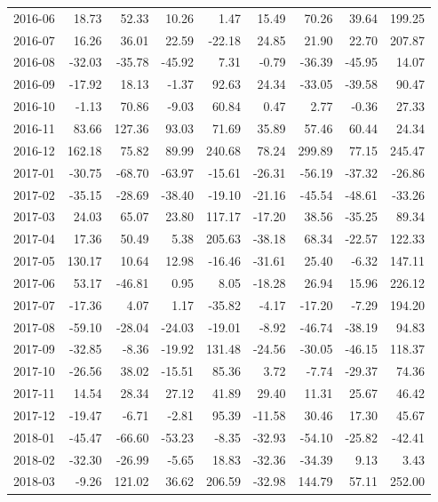 \begin{table}[ht]
\begin{tabular}{lrrrrrrrr}
  2016-06 & 18.73 & 52.33 & 10.26 & 1.47 & 15.49 & 70.26 & 39.64 & 199.25 \\ 
  2016-07 & 16.26 & 36.01 & 22.59 & -22.18 & 24.85 & 21.90 & 22.70 & 207.87 \\ 
  2016-08 & -32.03 & -35.78 & -45.92 & 7.31 & -0.79 & -36.39 & -45.95 & 14.07 \\ 
  2016-09 & -17.92 & 18.13 & -1.37 & 92.63 & 24.34 & -33.05 & -39.58 & 90.47 \\ 
  2016-10 & -1.13 & 70.86 & -9.03 & 60.84 & 0.47 & 2.77 & -0.36 & 27.33 \\ 
  2016-11 & 83.66 & 127.36 & 93.03 & 71.69 & 35.89 & 57.46 & 60.44 & 24.34 \\ 
  2016-12 & 162.18 & 75.82 & 89.99 & 240.68 & 78.24 & 299.89 & 77.15 & 245.47 \\ 
  2017-01 & -30.75 & -68.70 & -63.97 & -15.61 & -26.31 & -56.19 & -37.32 & -26.86 \\ 
  2017-02 & -35.15 & -28.69 & -38.40 & -19.10 & -21.16 & -45.54 & -48.61 & -33.26 \\ 
  2017-03 & 24.03 & 65.07 & 23.80 & 117.17 & -17.20 & 38.56 & -35.25 & 89.34 \\ 
  2017-04 & 17.36 & 50.49 & 5.38 & 205.63 & -38.18 & 68.34 & -22.57 & 122.33 \\ 
  2017-05 & 130.17 & 10.64 & 12.98 & -16.46 & -31.61 & 25.40 & -6.32 & 147.11 \\ 
  2017-06 & 53.17 & -46.81 & 0.95 & 8.05 & -18.28 & 26.94 & 15.96 & 226.12 \\ 
  2017-07 & -17.36 & 4.07 & 1.17 & -35.82 & -4.17 & -17.20 & -7.29 & 194.20 \\ 
  2017-08 & -59.10 & -28.04 & -24.03 & -19.01 & -8.92 & -46.74 & -38.19 & 94.83 \\ 
  2017-09 & -32.85 & -8.36 & -19.92 & 131.48 & -24.56 & -30.05 & -46.15 & 118.37 \\ 
  2017-10 & -26.56 & 38.02 & -15.51 & 85.36 & 3.72 & -7.74 & -29.37 & 74.36 \\ 
  2017-11 & 14.54 & 28.34 & 27.12 & 41.89 & 29.40 & 11.31 & 25.67 & 46.42 \\ 
  2017-12 & -19.47 & -6.71 & -2.81 & 95.39 & -11.58 & 30.46 & 17.30 & 45.67 \\ 
  2018-01 & -45.47 & -66.60 & -53.23 & -8.35 & -32.93 & -54.10 & -25.82 & -42.41 \\ 
  2018-02 & -32.30 & -26.99 & -5.65 & 18.83 & -32.36 & -34.39 & 9.13 & 3.43 \\ 
  2018-03 & -9.26 & 121.02 & 36.62 & 206.59 & -32.98 & 144.79 & 57.11 & 252.00 \\ 

\end{tabular}
\end{table}
